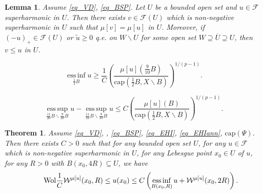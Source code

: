 \documentclass[10pt,a4paper]{amsart}
\newtheorem{lemma}{Lemma}
\newtheorem{theorem}{Theorem}
\newcommand{\einf}{\operatorname*{ess\,inf}}
\newcommand{\esup}{\operatorname*{ess\,sup}}
\begin{document}
\begin{lemma}\label{lem_FU_modi}
Assume \ref{eq_VD}, \ref{eq_BSP}. Let $U$ be a bounded open set and $u\in\mathcal{F}$ superharmonic in $U$. Then there exists $v\in\mathcal{F}(U)$ which is non-negative superharmonic in $U$ such that $\mu[v]=\mu[u]$ in $U$. Moreover, if $(-u)_+\in \mathcal{F}(U)$ or $\widetilde{u}\ge0$ q.e. on $W\backslash U$ for some open set $W\supseteq\overline{U}\supseteq U$, then $v\le u$ in $U$.
\end{lemma}

\begin{equation}\label{eq_Wolff1}
\einf_{\frac{1}{2}B}u\ge \frac{1}{C}\left(\frac{\mu[u]\left(\frac{9}{10}B\right)}{\mathrm{cap}\left(\frac{1}{2}B,X\backslash B\right)}\right)^{1/(p-1)}.
\end{equation}

\begin{equation}\label{eq_Wolff2}
\esup_{\frac{11}{20}B\backslash {\frac{9}{20}B}}u-\esup_{\frac{11}{10}B\backslash {\frac{9}{10}B}}u\le C\left(\frac{\mu[u](B)}{\mathrm{cap}\left(\frac{1}{2}B,X\backslash B\right)}\right)^{1/(p-1)}.
\end{equation}

\begin{theorem}\label{thm_Wolff}
Assume \ref{eq_VD}, \hyperlink{eq_LSC}{}, \ref{eq_BSP}, \ref{eq_EHI}, \ref{eq_EHIann}, \hyperlink{eq_cap}{$\text{cap}(\Psi)$}. Then there exists $C>0$ such that for any bounded open set $U$, for any $u\in\mathcal{F}$ which is non-negative superharmonic in $U$, for any Lebesgue point $x_0\in U$ of $u$, for any $R>0$ with $B(x_0,4R)\subseteq U$, we have
\begin{equation*}\label{eq_Wolff}\tag*{$\text{Wol}$}
\frac{1}{C}\mathcal{W}^{\mu[u]}(x_0,R)\le u(x_0)\le C \left(\einf_{B(x_0,R)}u+\mathcal{W}^{\mu[u]}(x_0,2R)\right).
\end{equation*}
\end{theorem}
\end{document}
